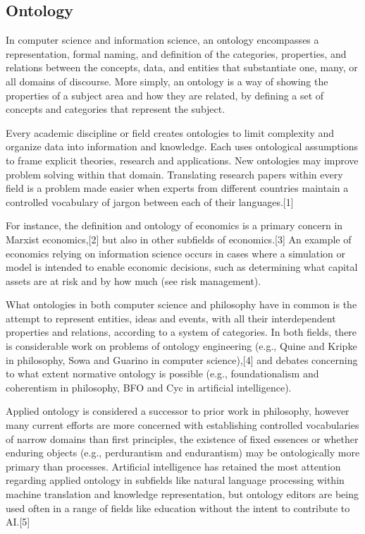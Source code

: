 \subsection*{Ontology}
In computer science and information science, an ontology encompasses a representation, formal naming, and definition of the categories, properties, and relations between the concepts, data, and entities that substantiate one, many, or all domains of discourse. More simply, an ontology is a way of showing the properties of a subject area and how they are related, by defining a set of concepts and categories that represent the subject.

Every academic discipline or field creates ontologies to limit complexity and organize data into information and knowledge. Each uses ontological assumptions to frame explicit theories, research and applications. New ontologies may improve problem solving within that domain. Translating research papers within every field is a problem made easier when experts from different countries maintain a controlled vocabulary of jargon between each of their languages.[1]

For instance, the definition and ontology of economics is a primary concern in Marxist economics,[2] but also in other subfields of economics.[3] An example of economics relying on information science occurs in cases where a simulation or model is intended to enable economic decisions, such as determining what capital assets are at risk and by how much (see risk management).

What ontologies in both computer science and philosophy have in common is the attempt to represent entities, ideas and events, with all their interdependent properties and relations, according to a system of categories. In both fields, there is considerable work on problems of ontology engineering (e.g., Quine and Kripke in philosophy, Sowa and Guarino in computer science),[4] and debates concerning to what extent normative ontology is possible (e.g., foundationalism and coherentism in philosophy, BFO and Cyc in artificial intelligence).

Applied ontology is considered a successor to prior work in philosophy, however many current efforts are more concerned with establishing controlled vocabularies of narrow domains than first principles, the existence of fixed essences or whether enduring objects (e.g., perdurantism and endurantism) may be ontologically more primary than processes. Artificial intelligence has retained the most attention regarding applied ontology in subfields like natural language processing within machine translation and knowledge representation, but ontology editors are being used often in a range of fields like education without the intent to contribute to AI.[5]

